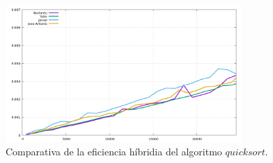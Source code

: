 \documentclass[11pt,a4paper]{article}
\begin{document}
\begin{figure}[H]
	\centering
	\includegraphics[width=0.8\textwidth]{../plots/quicksort}
	\caption{Comparativa de la eficiencia híbridia del algoritmo $quicksort$.}
\end{figure}
\end{document}

